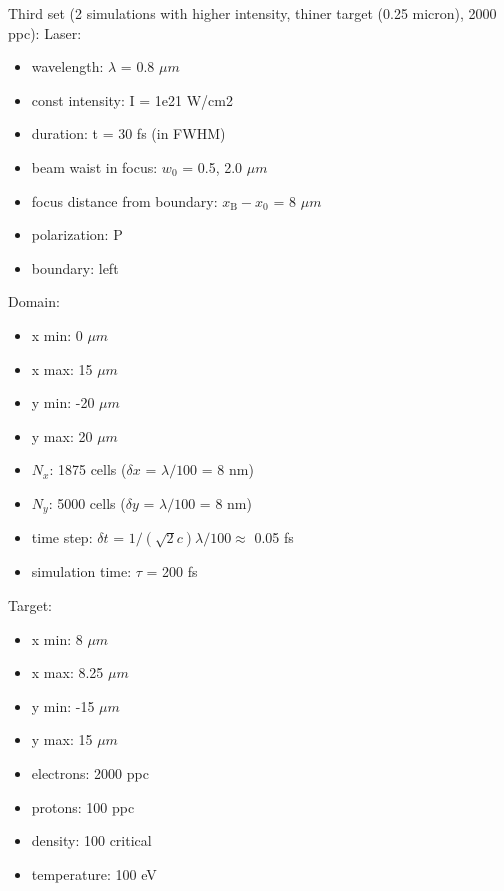 \noindent
Third set (2 simulations with higher intensity, thiner target (0.25 micron), 2000 ppc):
\noindent
Laser:
\begin{itemize}
	\item wavelength: $ \lambda $ = 0.8 $ \mu m $
	\item const intensity: I = 1e21 W/cm2
	\item duration: t = 30 fs (in FWHM)
	\item beam waist in focus: $ w_0 $ = 0.5, 2.0 $ \mu m $
	\item focus distance from boundary: $ x_\mathrm{B} - x_0 $ = 8 $ \mu m $
	\item polarization: P
	\item boundary: left 
\end{itemize}
Domain:
\begin{itemize}
	\item x min: 0 $ \mu m $
	\item x max: 15 $ \mu m $
	\item y min: -20 $ \mu m $
	\item y max: 20 $ \mu m $
	\item $ N_x $: 1875 cells ($ \delta x $ = $ \lambda/100 $ = 8 nm)
	\item $ N_y $: 5000 cells ($ \delta y $ = $ \lambda/100 $ = 8 nm)
	\item time step: $ \delta t $ = $ 1/(\sqrt{2} c) \lambda /100 \approx $ 0.05 fs 
	\item simulation time: $ \tau $ = 200 fs
\end{itemize}
Target:
\begin{itemize}
	\item x min: 8 $ \mu m $
	\item x max: 8.25 $ \mu m $
	\item y min: -15 $ \mu m $
	\item y max: 15 $ \mu m $
	\item electrons: 2000 ppc
	\item protons: 100 ppc
	\item density: 100 critical
	\item temperature: 100 eV
\end{itemize}